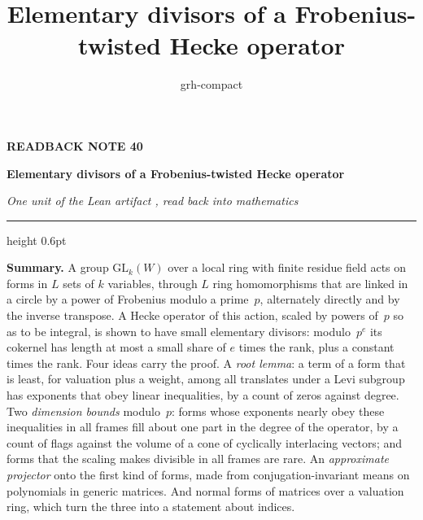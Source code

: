 \documentclass[11pt,a4paper]{article}
\title{Elementary divisors of a Frobenius-twisted Hecke operator}
\author{grh-compact}
\date{}
\newcommand{\m}[1]{\mbox{$#1$}}        %
\theoremstyle{plainx}
\theoremstyle{uprightx}
\newcommand{\GLk}{\mathrm{GL}_{k}}
\begin{document}
\color{ink}

{\raggedright
{\sffamily\bfseries\fontsize{7.2}{9}\selectfont\color{leancol}READBACK NOTE 40\par}
\vspace{5pt}
{\fontsize{21.5}{25.5}\selectfont\bfseries Elementary divisors of a Frobenius-twisted Hecke operator\par}
\vspace{5pt}
{\fontsize{12.4}{16}\selectfont\itshape\color{inksoft} One unit of the Lean artifact \ArtifactName, read back into
mathematics\par}}
\vspace{8pt}
{\color{rulegrey}\hrule height 0.6pt}
\vspace{7pt}
\thispagestyle{empty}

\textbf{Summary.} A group \m{\GLk(W)} over a local ring with finite residue field acts on forms in $L$ sets of
$k$ variables, through $L$ ring homomorphisms that are linked in a circle by a power of Frobenius modulo a
prime~$p$, alternately directly and by the inverse transpose. A Hecke operator of this action, scaled by powers
of~$p$ so as to be integral, is shown to have small elementary divisors: modulo~\m{p^{e}} its cokernel has length
at most a small share of $e$ times the rank, plus a constant times the rank. Four ideas carry the proof. A \emph{root lemma}: a
term of a form that is least, for valuation plus a weight, among all translates under a Levi subgroup has
exponents that obey linear inequalities, by a count of zeros against degree. Two \emph{dimension bounds}
modulo~$p$: forms whose exponents nearly obey these inequalities in all frames fill about one part in the degree
of the operator, by a count of flags against the volume of a cone of cyclically interlacing vectors; and forms
that the scaling makes divisible in all frames are rare. An \emph{approximate projector} onto the first kind of
forms, made from conjugation-invariant means on polynomials in generic matrices. And normal forms of matrices
over a valuation ring, which turn the three into a statement about indices.
\end{document}
